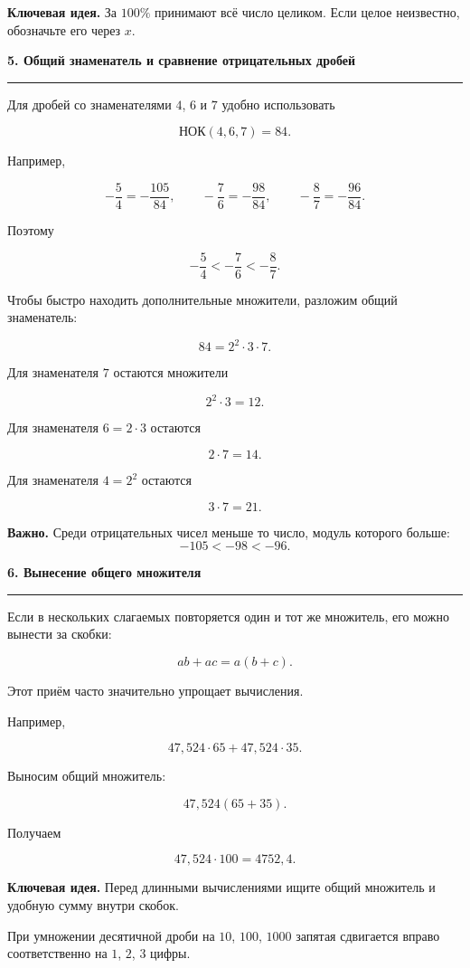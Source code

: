\documentclass[a4paper,12pt]{article}
\newcommand{\sectiontitle}[1]{%
  \vspace{0.6em}%
  {\Large\bfseries\textcolor{darkaccent}{#1}}\par
  \vspace{0.25em}%
  {\color{linegray}\rule{\linewidth}{0.6pt}}\par
  \vspace{0.5em}%
}
\newcommand{\keyidea}[1]{%
  \textbf{\textcolor{darkaccent}{Ключевая идея.}} #1
}
\newcommand{\warning}[1]{%
  \textbf{\textcolor{accent}{Важно.}} #1
}
\begin{document}
\keyidea{
За $100\%$ принимают всё число целиком.
Если целое неизвестно, обозначьте его через $x$.
}


\sectiontitle{5. Общий знаменатель и сравнение отрицательных дробей}

Для дробей со знаменателями $4$, $6$ и $7$ удобно использовать

\[
\text{НОК}(4,6,7)=84.
\]

Например,

\[
-\frac54
=
-\frac{105}{84},
\qquad
-\frac76
=
-\frac{98}{84},
\qquad
-\frac87
=
-\frac{96}{84}.
\]

Поэтому

\[
-\frac54
<
-\frac76
<
-\frac87.
\]

Чтобы быстро находить дополнительные множители, разложим общий знаменатель:

\[
84=2^2\cdot3\cdot7.
\]

Для знаменателя $7$ остаются множители

\[
2^2\cdot3=12.
\]

Для знаменателя $6=2\cdot3$ остаются

\[
2\cdot7=14.
\]

Для знаменателя $4=2^2$ остаются

\[
3\cdot7=21.
\]

\warning{
Среди отрицательных чисел меньше то число, модуль которого больше:
\[
-105<-98<-96.
\]
}


\sectiontitle{6. Вынесение общего множителя}

Если в нескольких слагаемых повторяется один и тот же множитель,
его можно вынести за скобки:

\[
ab+ac=a(b+c).
\]

Этот приём часто значительно упрощает вычисления.

Например,

\[
47{,}524\cdot65
+
47{,}524\cdot35.
\]

Выносим общий множитель:

\[
47{,}524(65+35).
\]

Получаем

\[
47{,}524\cdot100
=
4752{,}4.
\]

\keyidea{
Перед длинными вычислениями ищите общий множитель и удобную сумму
внутри скобок.
}

При умножении десятичной дроби на $10$, $100$, $1000$
запятая сдвигается вправо соответственно на $1$, $2$, $3$ цифры.
\end{document}
